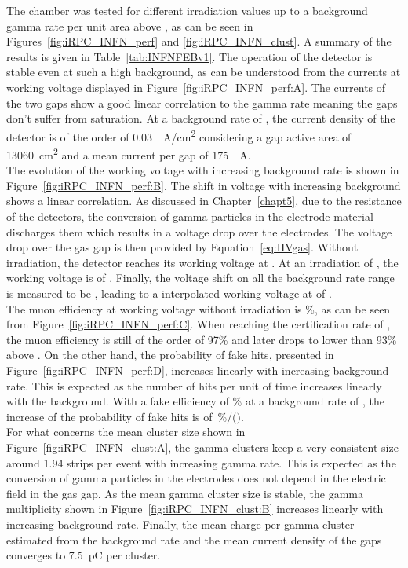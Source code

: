 	The chamber was tested for different irradiation values up to a background gamma rate per unit area above , as can be seen in Figures~\ref{fig:iRPC_INFN_perf} and \ref{fig:iRPC_INFN_clust}. A summary of the results is given in Table~\ref{tab:INFNFEBv1}. The operation of the detector is stable even at such a high background, as can be understood from the currents at working voltage displayed in Figure~\ref{fig:iRPC_INFN_perf:A}. The currents of the two gaps show a good linear correlation to the gamma rate meaning the gaps don't suffer from saturation. At a background rate of , the current density of the detector is of the order of \SI{0.03}{\mu A/cm^2} considering a gap active area of \SI{13060}{cm^2} and a mean current per gap of \SI{175}{\mu A}.\\
	The evolution of the working voltage with increasing background rate is shown in Figure~\ref{fig:iRPC_INFN_perf:B}. The shift in voltage with increasing background shows a linear correlation. As discussed in Chapter~\ref{chapt5}, due to the resistance of the detectors, the conversion of gamma particles in the electrode material discharges them which results in a voltage drop over the electrodes. The voltage drop over the gas gap is then provided by Equation~\ref{eq:HVgas}. Without irradiation, the detector reaches its working voltage at . At an irradiation of , the working voltage is of . Finally, the voltage shift on all the background rate range is measured to be , leading to a interpolated working voltage at  of .\\
	The muon efficiency at working voltage without irradiation is \%, as can be seen from Figure~\ref{fig:iRPC_INFN_perf:C}. When reaching the certification rate of , the muon efficiency is still of the order of 97\% and later drops to lower than 93\% above . On the other hand, the probability of fake hits, presented in Figure~\ref{fig:iRPC_INFN_perf:D}, increases linearly with increasing background rate. This is expected as the number of hits per unit of time increases linearly with the background. With a fake efficiency of \% at a background rate of , the increase of the probability of fake hits is of \,\%$/($\sikrate$)$.\\
    For what concerns the mean cluster size shown in Figure~\ref{fig:iRPC_INFN_clust:A}, the gamma clusters keep a very consistent size around 1.94 strips per event with increasing gamma rate. This is expected as the conversion of gamma particles in the electrodes does not depend in the electric field in the gas gap. As the mean gamma cluster size is stable, the gamma multiplicity shown in Figure~\ref{fig:iRPC_INFN_clust:B} increases linearly with increasing background rate. Finally, the mean charge per gamma cluster estimated from the background rate and the mean current density of the gaps converges to \SI{7.5}{pC} per cluster.\\
